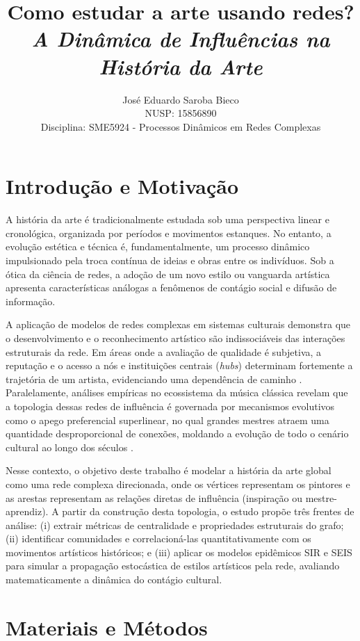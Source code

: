 \documentclass[12pt,a4paper]{article}
\title{\textbf{Como estudar a arte usando redes?}\\ \large \textit{A Dinâmica de Influências na História da Arte}}
\author{José Eduardo Saroba Bieco \\ NUSP: 15856890 \\ Disciplina: SME5924 - Processos Dinâmicos em Redes Complexas}
\begin{document}
\maketitle

\section{Introdução e Motivação}

A história da arte é tradicionalmente estudada sob uma perspectiva linear e cronológica, organizada por períodos e movimentos estanques. No entanto, a evolução estética e técnica é, fundamentalmente, um processo dinâmico impulsionado pela troca contínua de ideias e obras entre os indivíduos. Sob a ótica da ciência de redes, a adoção de um novo estilo ou vanguarda artística apresenta características análogas a fenômenos de contágio social e difusão de informação.

A aplicação de modelos de redes complexas em sistemas culturais demonstra que o desenvolvimento e o reconhecimento artístico são indissociáveis das interações estruturais da rede. Em áreas onde a avaliação de qualidade é subjetiva, a reputação e o acesso a nós e instituições centrais (\textit{hubs}) determinam fortemente a trajetória de um artista, evidenciando uma dependência de caminho \cite{Fraiberger2018}. Paralelamente, análises empíricas no ecossistema da música clássica revelam que a topologia dessas redes de influência é governada por mecanismos evolutivos como o apego preferencial superlinear, no qual grandes mestres atraem uma quantidade desproporcional de conexões, moldando a evolução de todo o cenário cultural ao longo dos séculos \cite{park2015}.

Nesse contexto, o objetivo deste trabalho é modelar a história da arte global como uma rede complexa direcionada, onde os vértices representam os pintores e as arestas representam as relações diretas de influência (inspiração ou mestre-aprendiz). A partir da construção desta topologia, o estudo propõe três frentes de análise: (i) extrair métricas de centralidade e propriedades estruturais do grafo; (ii) identificar comunidades e correlacioná-las quantitativamente com os movimentos artísticos históricos; e (iii) aplicar os modelos epidêmicos SIR e SEIS para simular a propagação estocástica de estilos artísticos pela rede, avaliando matematicamente a dinâmica do contágio cultural.

\section{Materiais e Métodos}
\end{document}
